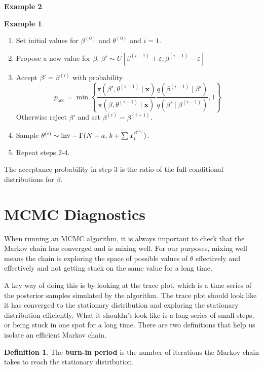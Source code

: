 \documentclass[
]{book}
\providecommand{\tightlist}{%
  \setlength{\itemsep}{0pt}\setlength{\parskip}{0pt}}
\theoremstyle{definition}
\newtheorem{definition}{Definition}[chapter]
\theoremstyle{definition}
\newtheorem{example}{Example}[chapter]
\theoremstyle{definition}
\theoremstyle{definition}
\theoremstyle{remark}
\begin{document}
\begin{example}
\begin{example}
\begin{enumerate}
\def\labelenumi{\arabic{enumi}.}
\tightlist
\item
  Set initial values for \(\beta^{(0)}\) and \(\theta^{(0)}\) and \(i = 1\).
\item
  Propose a new value for \(\beta\), \(\beta' \sim U[\beta^{(i-1)} + \varepsilon, \beta^{(i-1)} - \varepsilon]\)
\item
  Accept \(\beta' = \beta^{(i)}\) with probability
  \[
  p_{\textrm{acc}} = \min\left\{\frac{\pi(\beta', \theta^{(i-1)} \mid \boldsymbol{x})}{\pi(\beta, \theta^{(i-1)} \mid \boldsymbol{x})}\frac{q(\beta^{(i-1)} \mid \beta')}{q(\beta' \mid \beta^{(i-1)})} , 1\right\}
  \]
  Otherwise reject \(\beta'\) and set \(\beta^{(i)} = \beta^{(i-1)}\).
\item
  Sample \(\theta^{(i)} \sim \hbox{inv}-\Gamma(N + a,\, b + \sum x_i^{\beta^{(i)}})\).
\item
  Repeat steps 2-4.
\end{enumerate}

The acceptance probability in step 3 is the ratio of the full conditional distributions for \(\beta\).
\end{example}

\hypertarget{mcmc-diagnostics}{%
\section{MCMC Diagnostics}\label{mcmc-diagnostics}}

When running an MCMC algorithm, it is always important to check that the Markov chain has converged and is mixing well. For our purposes, mixing well means the chain is exploring the space of possible values of \(\theta\) effectively and effectively and not getting stuck on the same value for a long time.

A key way of doing this is by looking at the trace plot, which is a time series of the posterior samples simulated by the algorithm. The trace plot should look like it has converged to the stationary distribution and exploring the stationary distribution efficiently. What it shouldn't look like is a long series of small steps, or being stuck in one spot for a long time. There are two definitions that help us isolate an efficient Markov chain.

\begin{definition}
The \textbf{burn-in period} is the number of iterations the Markov chain takes to reach the stationary distribution.
\end{definition}


\end{example}
\end{document}
